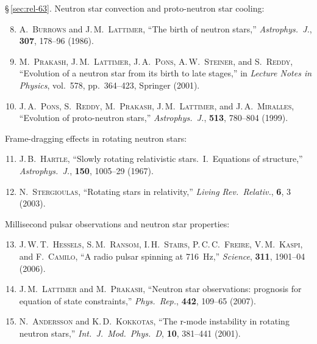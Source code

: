 \noindent\S\,\ref{sec:rel-63}.
Neutron star convection and proto-neutron star cooling:

\begin{enumerate}\setcounter{enumi}{7}
\item A.\ \textsc{Burrows} and J.\,M.\ \textsc{Lattimer},
  ``The birth of neutron stars,'' \emph{Astrophys.\ J.},
  \textbf{307}, 178--96 (1986).

\item M.\ \textsc{Prakash}, J.\,M.\ \textsc{Lattimer},
  J.\,A.\ \textsc{Pons}, A.\,W.\ \textsc{Steiner}, and
  S.\ \textsc{Reddy}, ``Evolution of a neutron star from its birth
  to late stages,'' in \emph{Lecture Notes in Physics}, vol.~578,
  pp.~364--423, Springer (2001).

\item J.\,A.\ \textsc{Pons}, S.\ \textsc{Reddy},
  M.\ \textsc{Prakash}, J.\,M.\ \textsc{Lattimer}, and
  J.\,A.\ \textsc{Miralles}, ``Evolution of proto-neutron stars,''
  \emph{Astrophys.\ J.}, \textbf{513}, 780--804 (1999).
\end{enumerate}

\noindent Frame-dragging effects in rotating neutron stars:

\begin{enumerate}\setcounter{enumi}{10}
\item J.\,B.\ \textsc{Hartle}, ``Slowly rotating relativistic
  stars.~I.\ Equations of structure,'' \emph{Astrophys.\ J.},
  \textbf{150}, 1005--29 (1967).

\item N.\ \textsc{Stergioulas}, ``Rotating stars in relativity,''
  \emph{Living Rev.\ Relativ.}, \textbf{6}, 3 (2003).
\end{enumerate}

\noindent Millisecond pulsar observations and neutron star
properties:

\begin{enumerate}\setcounter{enumi}{12}
\item J.\,W.\,T.\ \textsc{Hessels}, S.\,M.\ \textsc{Ransom},
  I.\,H.\ \textsc{Stairs}, P.\,C.\,C.\ \textsc{Freire},
  V.\,M.\ \textsc{Kaspi}, and F.\ \textsc{Camilo},
  ``A radio pulsar spinning at 716~Hz,''
  \emph{Science}, \textbf{311}, 1901--04 (2006).

\item J.\,M.\ \textsc{Lattimer} and M.\ \textsc{Prakash},
  ``Neutron star observations: prognosis for equation of state
  constraints,''
  \emph{Phys.\ Rep.}, \textbf{442}, 109--65 (2007).

\item N.\ \textsc{Andersson} and K.\,D.\ \textsc{Kokkotas},
  ``The r-mode instability in rotating neutron stars,''
  \emph{Int.\ J.\ Mod.\ Phys.\ D}, \textbf{10}, 381--441 (2001).
\end{enumerate}

